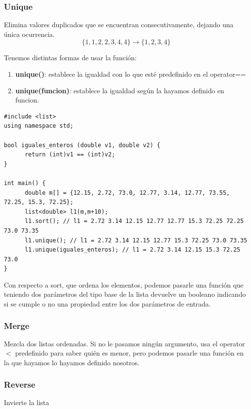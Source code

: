 \documentclass[10pt,a4paper,spanish]{report}
\begin{document}
\subsubsection{\textcolor[rgb]{0.2,0.5,0.5}Unique}
\noindent
Elimina valores duplicados que se encuentran consecutivamente, dejando una única ocurrencia.
\begin{displaymath}
\{1,1,2,2,3,4,4\} \longrightarrow \{1,2,3,4\}
\end{displaymath}

\noindent
Tenemos distintas formas de usar la función:
\begin{enumerate}[---]
\item \textbf{\textcolor[rgb]{0.2,0.5,0.5}{unique()}}: establece la igualdad con lo que esté predefinido en el operator==
\item \textbf{\textcolor[rgb]{0.2,0.5,0.5}{unique(funcion)}}: establece la igualdad según la hayamos definido en funcion.
\end{enumerate}

\begin{verbatim}
#include <list>
using namespace std;

bool iguales_enteros (double v1, double v2) {
      return (int)v1 == (int)v2;
}

int main() {
      double m[] = {12.15, 2.72, 73.0, 12.77, 3.14, 12.77, 73.55, 72.25, 15.3, 72.25};
      list<double> l1(m,m+10);
      l1.sort(); // l1 = 2.72 3.14 12.15 12.77 12.77 15.3 72.25 72.25 73.0 73.35
      l1.unique(); // l1 = 2.72 3.14 12.15 12.77 15.3 72.25 73.0 73.35
      l1.unique(iguales_enteros); // l1 = 2.72 3.14 12.15 15.3 72.25 73.0
}
\end{verbatim}
Con respecto a sort, que ordena los elementos, podemos pasarle una función que teniendo dos parámetros del tipo
base de la lista devuelve un booleano indicando si se cumple o no una propiedad entre los dos parámetros de entrada.

\subsubsection{\textcolor[rgb]{0.2,0.5,0.5}Merge}
\noindent
Mezcla dos listas ordenadas. Si no le pasamos ningún argumento, usa el operator $<$ predefinido para saber quién es menor, pero podemos pasarle una función en la que hayamos lo hayamos definido nosotros.

\subsubsection{\textcolor[rgb]{0.2,0.5,0.5}Reverse}
\noindent
Invierte la lista
\end{document}
